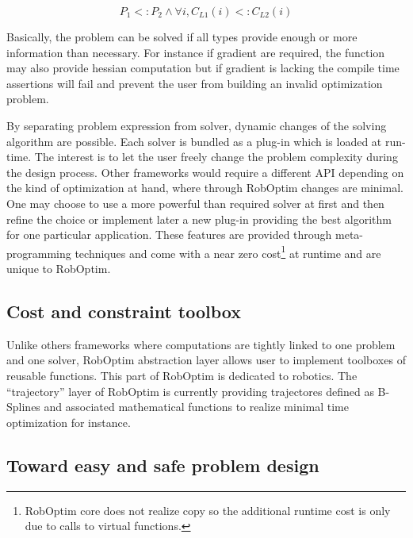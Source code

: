 \documentclass[conference,final,a4paper,twocolumn,9pt]{IEEEtran}
\begin{document}
\begin{equation}
  P_1 <: P_2 \wedge \forall i, C_{L1}(i) <: C_{L2}(i)
\end{equation}


Basically, the problem can be solved if all types provide enough or
more information than necessary. For instance if gradient are
required, the function may also provide hessian computation but if
gradient is lacking the compile time assertions will fail and prevent
the user from building an invalid optimization problem.

By separating problem expression from solver, dynamic changes of the
solving algorithm are possible. Each solver is bundled as a plug-in
which is loaded at run-time. The interest is to let the user freely change
the problem complexity during the design process. Other
frameworks would require a different API depending on the kind of
optimization at hand, where through RobOptim changes are minimal. One
may choose to use a more powerful than required solver at first and
then refine the choice or implement later a new plug-in providing
the best algorithm for one particular application. These features are
provided through meta-programming techniques and come with a near zero
cost\footnote{RobOptim core does not realize copy so the additional
  runtime cost is only due to calls to virtual functions.} at runtime
and are unique to RobOptim.

\subsection{Cost and constraint toolbox}


Unlike others frameworks where computations are tightly linked to one
problem and one solver, RobOptim abstraction layer allows user to
implement toolboxes of reusable functions. This part of RobOptim is
dedicated to robotics. The ``trajectory'' layer of RobOptim is
currently providing trajectores defined as B-Splines and associated
mathematical functions to realize minimal time optimization for
instance.


\subsection{Toward easy and safe problem design}
\end{document}
